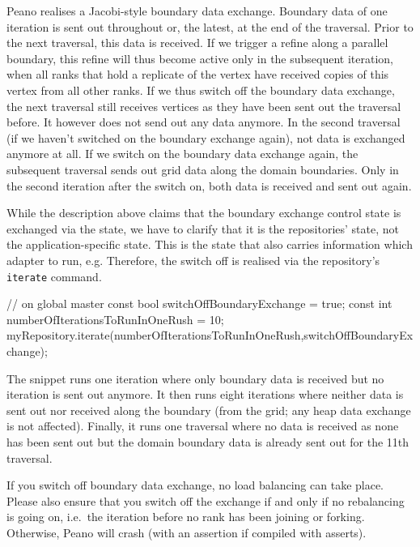 Peano realises a Jacobi-style boundary data exchange. 
Boundary data of one iteration is sent out throughout or, the latest, at the end
of the traversal.
Prior to the next traversal, this data is received. 
If we trigger a refine along a parallel boundary, this refine will thus become
active only in the subsequent iteration, when all ranks that hold a replicate of
the vertex have received copies of this vertex from all other ranks.
If we thus switch off the boundary data exchange, the next traversal still
receives vertices as they have been sent out the traversal before.
It however does not send out any data anymore.
In the second traversal (if we haven't switched on the boundary exchange again),
not data is exchanged anymore at all.
If we switch on the boundary data exchange again, the subsequent traversal sends
out grid data along the domain boundaries. 
Only in the second iteration after the switch on, both data is received and sent
out again.

While the description above claims that the boundary exchange control state is
exchanged via the state, we have to clarify that it is the repositories' state,
not the application-specific state. This is the state that also carries
information which adapter to run, e.g.
Therefore, the switch off is realised via the repository's \texttt{iterate}
command. 

\begin{code}
// on global master
const bool switchOffBoundaryExchange = true;
const int  numberOfIterationsToRunInOneRush = 10;
myRepository.iterate(numberOfIterationsToRunInOneRush,switchOffBoundaryExchange);
\end{code}

\noindent
The snippet runs one iteration where only boundary data is received but no
iteration is sent out anymore.
It then runs eight iterations where neither data is sent out nor received along
the boundary (from the grid; any heap data exchange is not affected).
Finally, it runs one traversal where no data is received as none has been sent
out but the domain boundary data is already sent out for the 11th traversal. 


\begin{remark}
  If you switch off boundary data exchange, no load balancing can take place.
  Please also ensure that you switch off the exchange if and only if no
  rebalancing is going on, i.e.~the iteration before no rank has been joining or
  forking. 
  Otherwise, Peano will crash (with an assertion if compiled with asserts).
\end{remark}


